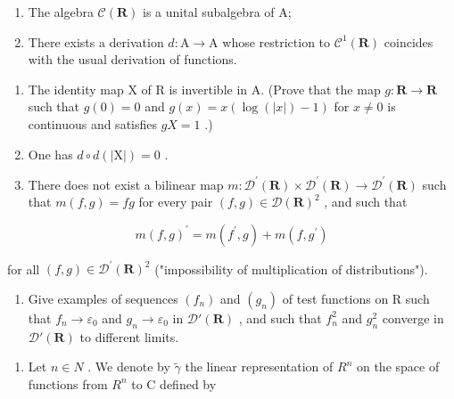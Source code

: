 \begin{enumerate}
\def\labelenumi{(\roman{enumi})}
\item
  The algebra \(\mathcal{C}(\mathbf{R})\) is a unital subalgebra of A;
\item
  There exists a derivation \(d\colon\mathrm{A}\to\mathrm{A}\) whose restriction to \(\mathcal{C}^{1}(\mathbf{R})\) coincides with the usual derivation of functions.
\end{enumerate}

\begin{enumerate}
\def\labelenumi{\alph{enumi})}
\item
  The identity map X of R is invertible in A. (Prove that the map \(g: \mathbf{R} \to \mathbf{R}\) such that \(g(0) = 0\) and \(g(x) = x(\log(|x|) - 1)\) for \(x \neq 0\) is continuous and satisfies \(gX = 1\) .)
\item
  One has \(d \circ d(|\mathrm{X}|) = 0\) .
\item
  There does not exist a bilinear map \(m\colon\mathcal{D}^{\prime}(\mathbf{R})\times\mathcal{D}^{\prime}(\mathbf{R})\to\mathcal{D}^{\prime}(\mathbf{R})\) such that \(m(f,g)=fg\) for every pair \((f,g)\in\mathcal{D}(\mathbf{R})^{2}\) , and such that
\end{enumerate}

\[
m (f, g) ^ {\prime} = m \left(f ^ {\prime}, g\right) + m \left(f, g ^ {\prime}\right)
\]

for all \((f,g)\in\mathcal{D}^{\prime}(\mathbf{R})^{2}\) ("impossibility of multiplication of distributions").

\begin{enumerate}
\def\labelenumi{\alph{enumi})}
\setcounter{enumi}{3}
\tightlist
\item
  Give examples of sequences \((f_{n})\) and \((g_{n})\) of test functions on R such that \(f_{n} \to \varepsilon_{0}\) and \(g_{n} \to \varepsilon_{0}\) in \(\mathcal{D}'(\mathbf{R})\) , and such that \(f_{n}^{2}\) and \(g_{n}^{2}\) converge in \(\mathcal{D}'(\mathbf{R})\) to different limits.
\end{enumerate}

\begin{enumerate}
\def\labelenumi{\arabic{enumi})}
\setcounter{enumi}{6}
\tightlist
\item
  Let \(n \in N\) . We denote by \(\widetilde{\gamma}\) the linear representation of \(R^{n}\) on the space of functions from \(R^{n}\) to C defined by
\end{enumerate}

